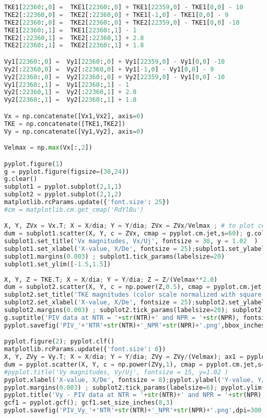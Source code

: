 \begin{lstlisting}[language=Python]
TKE1[22360:,0] =  TKE1[22360:,0] + TKE1[22359,0] - TKE1[0,0] - 10
TKE2[:22360,0] =  TKE2[:22360,0] + TKE1[-1,0] - TKE1[0,0] - 9
TKE2[22360:,0] =  TKE2[22360:,0] + TKE2[22359,0] - TKE1[0,0] -10
TKE1[22360:,1] =  TKE1[22360:,1] - 1
TKE2[:22360,1] =  TKE2[:22360,1] + 2.8
TKE2[22360:,1] =  TKE2[22360:,1] + 1.8

Vy1[22360:,0] =  Vy1[22360:,0] + Vy1[22359,0] - Vy1[0,0] -10
Vy2[:22360,0] =  Vy2[:22360,0] + Vy1[-1,0] - Vy1[0,0] - 9
Vy2[22360:,0] =  Vy2[22360:,0] + Vy2[22359,0] - Vy1[0,0] -10
Vy1[22360:,1] =  Vy1[22360:,1] - 1
Vy2[:22360,1] =  Vy2[:22360,1] + 2.8
Vy2[22360:,1] =  Vy2[22360:,1] + 1.8

Vx = np.concatenate([Vx1,Vx2], axis=0)
TKE = np.concatenate([TKE1,TKE2])
Vy = np.concatenate([Vy1,Vy2], axis=0)

Velmax = np.max(Vx[:,2])

pyplot.figure(1)
g = pyplot.figure(figsize=(30,24))
g.clear()
subplot1 = pyplot.subplot(2,1,1)
subplot2 = pyplot.subplot(2,1,2)
matplotlib.rcParams.update({'font.size': 25})
#cm = matplotlib.cm.get_cmap('RdYlBu')

X, Y, ZVx = Vx.T; X = X/dia; Y = Y/dia; ZVx = ZVx/Velmax ; # to plot centerlines
dum = subplot1.scatter(X, Y, c = ZVx, cmap = pyplot.cm.jet,s=60); g.colorbar(dum, ax = subplot1,pad=0.015)
subplot1.set_title('Vx magnitudes, Vx/Uj', fontsize = 30, y = 1.02  )  
subplot1.set_xlabel('X-value, X/De', fontsize = 25);subplot1.set_ylabel('Y-value, Y/De', fontsize = 25)
subplot1.margins(0.003) ; subplot1.tick_params(labelsize=20)
subplot1.set_ylim([-1.5,1.5])
      
X, Y, Z = TKE.T; X = X/dia; Y = Y/dia; Z = Z/(Velmax**2.0)
dum = subplot2.scatter(X, Y, c = np.power(Z,0.5), cmap = pyplot.cm.jet,s=60); g.colorbar(dum, ax = subplot2,pad=0.015)
subplot2.set_title('TKE magnitudes (color scale normalized with square root), TKE/Uj^2', fontsize = 30, y=1.02 )  
subplot2.set_xlabel('X-value, X/De', fontsize = 25);subplot2.set_ylabel('Y-value, Y/De', fontsize = 25)
subplot2.margins(0.003) ; subplot2.tick_params(labelsize=20); subplot2.set_ylim([-1.5,1.5])
g.suptitle('PIV data at NTR = '+str(NTR)+' and NPR = '+str(NPR), fontsize = 40, x = 0.47, y =0.95)
pyplot.savefig('PIV_'+'NTR'+str(NTR)+'_NPR'+str(NPR)+'.png',bbox_inches = 'tight', pad_inches = 0.4)

pyplot.figure(2); pyplot.clf()
matplotlib.rcParams.update({'font.size': 6})
X, Y, ZVy = Vy.T; X = X/dia; Y = Y/dia; ZVy = ZVy/(Velmax); ax1 = pyplot.gca();
dum = pyplot.scatter(X, Y, c = np.power(ZVy,1), cmap = pyplot.cm.jet,s=60); pyplot.colorbar(dum, ax = ax1,pad=0.015)
#pyplot.title('Vy magnitudes, Vy/Uj', fontsize = 15, y=1.02 )  
pyplot.xlabel('X-value, X/De', fontsize = 8);pyplot.ylabel('Y-value, Y/De', fontsize = 8)
pyplot.margins(0.003) ; subplot2.tick_params(labelsize=6); pyplot.ylim([-1.5,1.5])
pyplot.title('Vy - PIV data at NTR = '+str(NTR)+' and NPR = '+str(NPR), fontsize = 10, x = 0.51, y =1.01)
gcf1 = pyplot.gcf(); gcf1.set_size_inches(8,3)
pyplot.savefig('PIV_Vy_'+'NTR'+str(NTR)+'_NPR'+str(NPR)+'.png',dpi=300,bbox_inches = 'tight')


\end{lstlisting}
